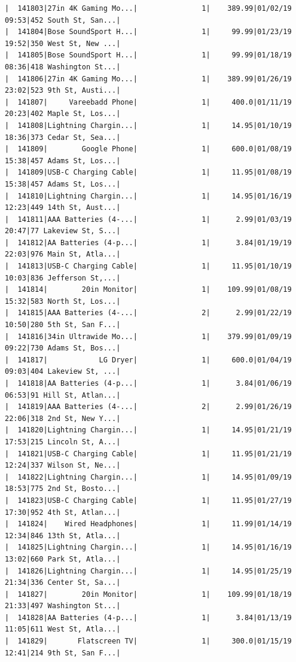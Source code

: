 \documentclass[
  letterpaper,
  DIV=11,
  numbers=noendperiod]{scrartcl}
\begin{document}
\begin{verbatim}
|  141803|27in 4K Gaming Mo...|               1|    389.99|01/02/19 09:53|452 South St, San...|
|  141804|Bose SoundSport H...|               1|     99.99|01/23/19 19:52|350 West St, New ...|
|  141805|Bose SoundSport H...|               1|     99.99|01/18/19 08:36|418 Washington St...|
|  141806|27in 4K Gaming Mo...|               1|    389.99|01/26/19 23:02|523 9th St, Austi...|
|  141807|     Vareebadd Phone|               1|     400.0|01/11/19 20:23|402 Maple St, Los...|
|  141808|Lightning Chargin...|               1|     14.95|01/10/19 18:36|373 Cedar St, Sea...|
|  141809|        Google Phone|               1|     600.0|01/08/19 15:38|457 Adams St, Los...|
|  141809|USB-C Charging Cable|               1|     11.95|01/08/19 15:38|457 Adams St, Los...|
|  141810|Lightning Chargin...|               1|     14.95|01/16/19 12:23|449 14th St, Aust...|
|  141811|AAA Batteries (4-...|               1|      2.99|01/03/19 20:47|77 Lakeview St, S...|
|  141812|AA Batteries (4-p...|               1|      3.84|01/19/19 22:03|976 Main St, Atla...|
|  141813|USB-C Charging Cable|               1|     11.95|01/10/19 10:03|836 Jefferson St,...|
|  141814|        20in Monitor|               1|    109.99|01/08/19 15:32|583 North St, Los...|
|  141815|AAA Batteries (4-...|               2|      2.99|01/22/19 10:50|280 5th St, San F...|
|  141816|34in Ultrawide Mo...|               1|    379.99|01/09/19 09:22|730 Adams St, Bos...|
|  141817|            LG Dryer|               1|     600.0|01/04/19 09:03|404 Lakeview St, ...|
|  141818|AA Batteries (4-p...|               1|      3.84|01/06/19 06:53|91 Hill St, Atlan...|
|  141819|AAA Batteries (4-...|               2|      2.99|01/26/19 22:06|318 2nd St, New Y...|
|  141820|Lightning Chargin...|               1|     14.95|01/21/19 17:53|215 Lincoln St, A...|
|  141821|USB-C Charging Cable|               1|     11.95|01/21/19 12:24|337 Wilson St, Ne...|
|  141822|Lightning Chargin...|               1|     14.95|01/09/19 18:53|775 2nd St, Bosto...|
|  141823|USB-C Charging Cable|               1|     11.95|01/27/19 17:30|952 4th St, Atlan...|
|  141824|    Wired Headphones|               1|     11.99|01/14/19 12:34|846 13th St, Atla...|
|  141825|Lightning Chargin...|               1|     14.95|01/16/19 13:02|660 Park St, Atla...|
|  141826|Lightning Chargin...|               1|     14.95|01/25/19 21:34|336 Center St, Sa...|
|  141827|        20in Monitor|               1|    109.99|01/18/19 21:33|497 Washington St...|
|  141828|AA Batteries (4-p...|               1|      3.84|01/13/19 11:05|611 West St, Atla...|
|  141829|       Flatscreen TV|               1|     300.0|01/15/19 12:41|214 9th St, San F...|

\end{verbatim}
\end{document}
